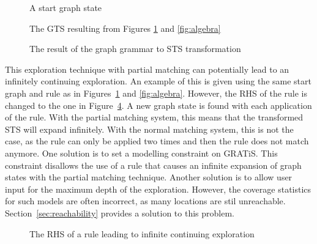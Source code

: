\begin{figure}[ht]
  \begin{center}
    
  \end{center}
  \caption{A start graph state}
  \label{fig:algebra_start_graph}
\end{figure}

\begin{figure}[ht]
  \begin{center}
    
  \end{center}
  \caption{The GTS resulting from Figures \ref{fig:algebra_start_graph} and \ref{fig:algebra}}
  \label{fig:algebra_gts}
\end{figure}

\begin{figure}[ht]
  \begin{center}
    
  \end{center}
  \caption{The result of the graph grammar to STS transformation}
  \label{fig:algebra_sts}
\end{figure}

This exploration technique with partial matching can potentially lead to an infinitely continuing exploration. An example of this is given using the same start graph and rule as in Figures~\ref{fig:algebra_start_graph} and \ref{fig:algebra}. However, the RHS of the rule is changed to the one in Figure~\ref{fig:algebra_rhs2}. A new graph state is found with each application of the rule. With the partial matching system, this means that the transformed STS will expand infinitely. With the normal matching system, this is not the case, as the rule can only be applied two times and then the rule does not match anymore. One solution is to set a modelling constraint on GRATiS. This constraint disallows the use of a rule that causes an infinite expansion of graph states with the partial matching technique. Another solution is to allow user input for the maximum depth of the exploration. However, the coverage statistics for such models are often incorrect, as many locations are stil unreachable. Section~\ref{sec:reachability} provides a solution to this problem. 

\begin{figure}[ht]
  \begin{center}
    
  \end{center}
  \caption{The RHS of a rule leading to infinite continuing exploration}
  \label{fig:algebra_rhs2}
\end{figure}

